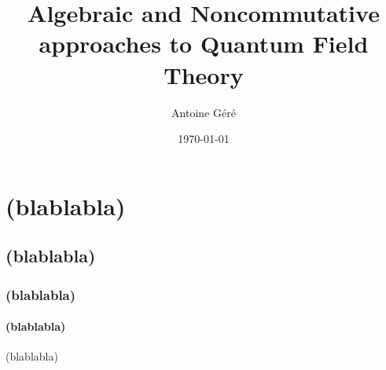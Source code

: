\documentclass{book}
\begin{document}

\title{Algebraic and Noncommutative approaches to Quantum Field Theory}

\author{Antoine Géré}

\date{\today}

\maketitle


\tableofcontents

\part{(blablabla)}

\chapter{(blablabla)}

\section{(blablabla)}

\subsection{(blablabla)}

(blablabla)


\nocite{*}





\end{document}
